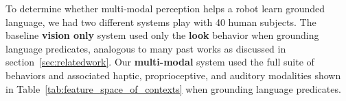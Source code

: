 To determine whether multi-modal perception helps a robot learn grounded language, we had two different systems play \ispy with 40 human subjects.
The baseline \textbf{vision only} system used only the \textbf{look} behavior when grounding language predicates, analogous to many past works as discussed in section~\ref{sec:relatedwork}.
Our \textbf{multi-modal} system used the full suite of behaviors and associated haptic, proprioceptive, and auditory modalities shown in Table~\ref{tab:feature_space_of_contexts} when grounding language predicates.